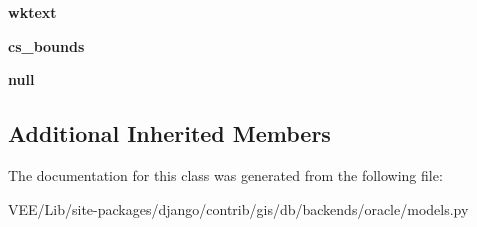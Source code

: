 \begin{DoxyCompactItemize}
{\bfseries wktext}
\item 
\mbox{\label{classdjango_1_1contrib_1_1gis_1_1db_1_1backends_1_1oracle_1_1models_1_1_oracle_spatial_ref_sys_af9dbdca92c60088119e2bb6eba6a7976}} 
{\bfseries cs\+\_\+bounds}
\item 
\mbox{\label{classdjango_1_1contrib_1_1gis_1_1db_1_1backends_1_1oracle_1_1models_1_1_oracle_spatial_ref_sys_ad5818faa4360b19a78f5534f3d1bbac6}} 
{\bfseries null}
\end{DoxyCompactItemize}
\subsection*{Additional Inherited Members}


The documentation for this class was generated from the following file\+:\begin{DoxyCompactItemize}
\item 
V\+E\+E/\+Lib/site-\/packages/django/contrib/gis/db/backends/oracle/models.\+py\end{DoxyCompactItemize}
